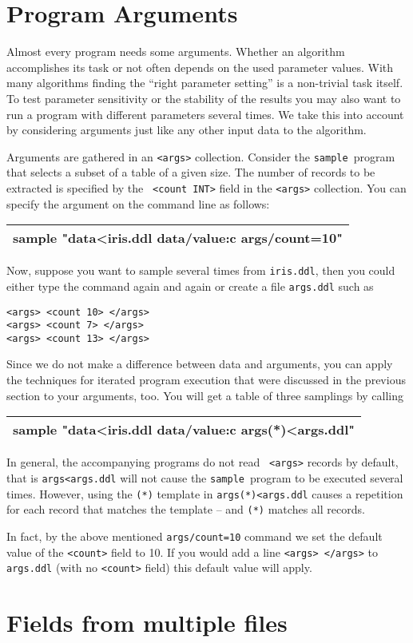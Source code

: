 \documentclass[a4paper]{book}
\newcommand{\cmd}[1]{%
{\vspace{-2mm}\tt\begin{center}\begin{tabular}{||l||}%
\hline%
#1\\%
\hline%
\end{tabular}\end{center}}\vspace{-2mm}}
\newcommand{\printprogram}[1]{{\tt #1}\index{#1}}
\newcommand{\psample}{\printprogram{sample}}
\begin{document}
\section{Program Arguments}

Almost every program needs some arguments. Whether an algorithm
accomplishes its task or not often depends on the used parameter
values. With many algorithms finding the ``right parameter setting''
is a non-trivial task itself.  To test parameter sensitivity or the
stability of the results you may also want to run a program with
different parameters several times. We take this into account by
considering arguments just like any other input data to the algorithm.

Arguments are gathered in an {\tt <args>} collection.  Consider the
\psample\ program that selects a subset of a table of a given
size. The number of records to be extracted is specified by the {\tt
<count INT>} field in the {\tt <args>} collection.  You can specify
the argument on the command line as follows: \cmd{sample
"data<iris.ddl data/value:c args/count=10"}

Now, suppose you want to sample several times from {\tt iris.ddl},
then you could either type the command again and again or create a
file {\tt args.ddl} such as
\begin{verbatim}
<args> <count 10> </args>
<args> <count 7> </args>
<args> <count 13> </args>
\end{verbatim}
Since we do not make a difference between data and arguments, you can apply
the techniques for iterated program execution that were discussed in the
previous section to your arguments, too. You will get a table of three
samplings by calling \cmd{sample "data<iris.ddl data/value:c
  args(*)<args.ddl"} In general, the accompanying programs do not read {\tt
  <args>} records by default, that is {\tt args<args.ddl} will not cause the
\psample\ program to be executed several times. However, using the {\tt (*)}
template in {\tt args(*)<args.ddl} causes a repetition for each record that
matches the template -- and {\tt (*)} matches all records.

In fact, by the above mentioned {\tt args/count=10} command we set the default
value of the {\tt <count>} field to 10. If you would add
a line {\tt <args> </args>} to {\tt args.ddl} (with no {\tt <count>} field)
this default value will apply.


\section{Fields from multiple files}
\end{document}
